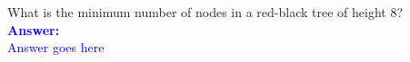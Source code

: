 \item{}
What is the minimum number of nodes in a red-black tree of height $8$?\\[12pt]
\ifanswers
\textcolor{blue}{
\textbf{Answer:}\\[6pt]
Answer goes here
}
\newpage
\fi
